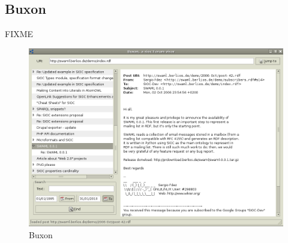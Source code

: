 \subsection*{Buxon}

FIXME

\begin{figure}[H]
	\centering
	\includegraphics[width=16cm]{images/screenshots/buxon.png}
	\caption{Buxon}
	\label{fig:buxon}
\end{figure}

